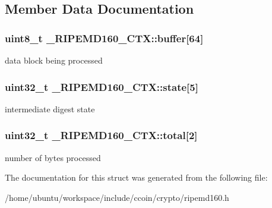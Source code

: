 \subsection{Member Data Documentation}
\hypertarget{struct__RIPEMD160__CTX_ac6b3e8f872dc74d2fa7ed5f592bc208e}{
\subsubsection[{buffer}]{\setlength{\rightskip}{0pt plus 5cm}uint8\-\_\-t \-\_\-\-R\-I\-P\-E\-M\-D160\-\_\-\-C\-T\-X\-::buffer\mbox{[}64\mbox{]}}}\label{struct__RIPEMD160__CTX_ac6b3e8f872dc74d2fa7ed5f592bc208e}
data block being processed \hypertarget{struct__RIPEMD160__CTX_a1a4553dd5a4507fd12b2d93ae06aa0cc}{
\subsubsection[{state}]{\setlength{\rightskip}{0pt plus 5cm}uint32\-\_\-t \-\_\-\-R\-I\-P\-E\-M\-D160\-\_\-\-C\-T\-X\-::state\mbox{[}5\mbox{]}}}\label{struct__RIPEMD160__CTX_a1a4553dd5a4507fd12b2d93ae06aa0cc}
intermediate digest state \hypertarget{struct__RIPEMD160__CTX_a2cbc656593e6b4a4b5611175cd798c39}{
\subsubsection[{total}]{\setlength{\rightskip}{0pt plus 5cm}uint32\-\_\-t \-\_\-\-R\-I\-P\-E\-M\-D160\-\_\-\-C\-T\-X\-::total\mbox{[}2\mbox{]}}}\label{struct__RIPEMD160__CTX_a2cbc656593e6b4a4b5611175cd798c39}
number of bytes processed 

The documentation for this struct was generated from the following file\-:\begin{DoxyCompactItemize}
\item 
/home/ubuntu/workspace/include/ccoin/crypto/ripemd160.\-h\end{DoxyCompactItemize}
